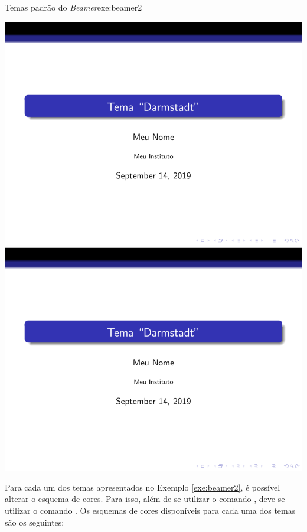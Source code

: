 \begin{texexptitled}{Temas padrão do \textit{Beamer}}{exe:beamer2}
\begin{tcbitemize}[raster columns=3,bicolor,
raster equal height,boxrule=0.1mm,
colframe=MaterialGreen900,colback=MaterialGrey50,
pdf comment]
\tcbitem[squeezed title={Szeged}]     \centering \includegraphics[scale=0.28,page=18]{./docs/figs/beamer.pdf}
\tcbitem[squeezed title={Warsaw}]     \centering \includegraphics[scale=0.28,page=19]{./docs/figs/beamer.pdf}
\end{tcbitemize}
\end{texexptitled}

Para cada um dos temas apresentados no Exemplo \ref{exe:beamer2}, é possível alterar o esquema de cores. Para isso, além de se utilizar o comando {\tt \usetheme}, deve-se utilizar o comando . Os esquemas de cores disponíveis para cada uma dos temas são os seguintes:

